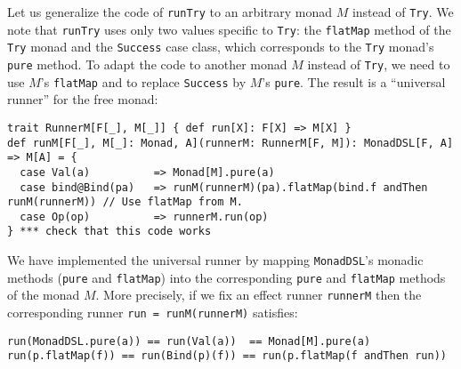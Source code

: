 Let us generalize the code of \lstinline!runTry!
to an arbitrary monad $M$ instead of \lstinline!Try!.
We note that \lstinline!runTry!
uses only two values specific to \lstinline!Try!:
the \lstinline!flatMap!
method of the \lstinline!Try!
monad and the \lstinline!Success!
case class, which corresponds to the \lstinline!Try!
monad\textsf{'}s \lstinline!pure!
method. To adapt the code to another monad $M$ instead of \lstinline!Try!,
we need to use $M$\textsf{'}s \lstinline!flatMap!
and to replace \lstinline!Success!
by $M$\textsf{'}s \lstinline!pure!.
The result is a \textsf{``}universal runner\textsf{''}
for the free monad:
\begin{lstlisting}
trait RunnerM[F[_], M[_]] { def run[X]: F[X] => M[X] }
def runM[F[_], M[_]: Monad, A](runnerM: RunnerM[F, M]): MonadDSL[F, A] => M[A] = {
  case Val(a)          => Monad[M].pure(a)
  case bind@Bind(pa)   => runM(runnerM)(pa).flatMap(bind.f andThen runM(runnerM)) // Use flatMap from M.
  case Op(op)          => runnerM.run(op)
} *** check that this code works
\end{lstlisting}
We have implemented the universal runner by mapping \lstinline!MonadDSL!\textsf{'}s
monadic methods (\lstinline!pure!
and \lstinline!flatMap!)
into the corresponding \lstinline!pure!
and \lstinline!flatMap!
methods of the monad $M$. More precisely, if we fix an effect runner
\lstinline!runnerM! then
the corresponding runner \lstinline!run = runM(runnerM)!
satisfies:
\begin{lstlisting}
run(MonadDSL.pure(a)) == run(Val(a))  == Monad[M].pure(a)
run(p.flatMap(f)) == run(Bind(p)(f)) == run(p.flatMap(f andThen run))
\end{lstlisting}
